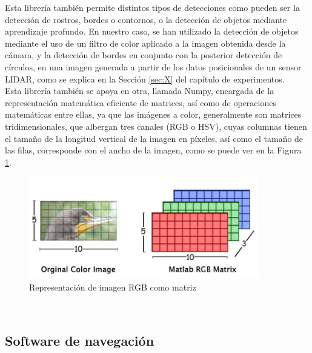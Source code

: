 Esta librería también permite distintos tipos de detecciones como pueden ser la
detección de rostros, bordes o contornos, o la detección de objetos mediante
aprendizaje profundo.
En nuestro caso, se han utilizado la detección de objetos mediante el uso de un
filtro de color aplicado a la imagen obtenida desde la cámara, y la detección de
bordes en conjunto con la posterior detección de círculos, en una imagen
generada a partir de los datos posicionales de un sensor LIDAR, como se explica
en la Sección \ref{sec:X} del capítulo de experimentos.
\\

Esta librería también se apoya en otra, llamada Numpy, encargada de la
representación matemática eficiente de matrices, así como de operaciones
matemáticas entre ellas, ya que las imágenes a color, generalmente son matrices
tridimensionales, que albergan tres canales (RGB o HSV), cuyas columnas tienen
el tamaño de la longitud vertical de la imagen en píxeles, así como el tamaño de
las filas, corresponde con el ancho de la imagen, como se puede ver en la Figura
\ref{fig:rgb_mat}.
\\

\begin{figure} [h!]
  \begin{center}
    \includegraphics[width=10cm]{figs/rgb_matrix}
  \end{center}
  \caption{Representación de imagen RGB como matriz \citep{rgb_mat}}
  \label{fig:rgb_mat}
\end{figure}\


\subsection{Software de navegación}
\label{sec:navegacion}

